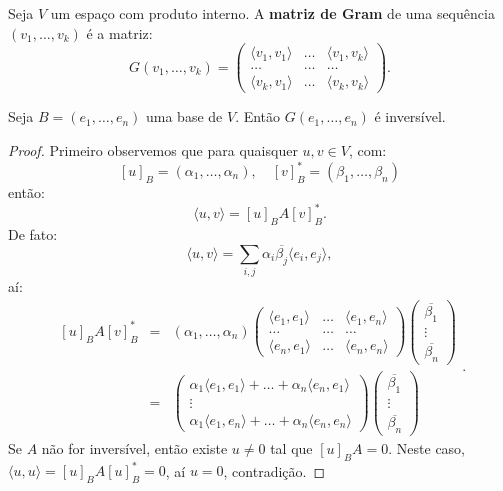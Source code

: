 \documentclass[11pt,twoside,a4paper]{book}
\begin{document}
\begin{definicao}
Seja $V$ um espaço com produto interno. A \textbf{matriz de Gram} de uma sequência $(v_1,\dots,v_k)$ é a matriz:
\[
G(v_1,\dots,v_k)=\begin{pmatrix}
\langle v_1,v_1\rangle&\dots&\langle v_1,v_k\rangle\\\dots&\dots&\dots\\\langle v_k,v_1\rangle&\dots&\langle v_k,v_k\rangle
\end{pmatrix}.
\]
\end{definicao}

\begin{proposicao}
Seja $B=(e_1,\dots,e_n)$ uma base de $V$. Então $G(e_1,\dots,e_n)$ é inversível.
\end{proposicao}
\begin{proof}
Primeiro observemos que para quaisquer $u,v\in V$, com:
\[
[u]_B=(\alpha_1,\dots,\alpha_n),\quad [v]_B^*=(\beta_1,\dots,\beta_n)
\]
então:
\[
\langle u,v\rangle=[u]_BA[v]_B^*.
\]
De fato:
\[
\langle u,v\rangle=\sum_{i,j}\alpha_i\overline{\beta_j}\langle e_i,e_j\rangle,
\]
aí:
\[
\begin{array}{rcl}
[u]_BA[v]_B^*&=&(\alpha_1,\dots,\alpha_n)\begin{pmatrix}
\langle e_1,e_1\rangle&\dots&\langle e_1,e_n\rangle\\\dots&\dots&\dots\\\langle e_n,e_1\rangle&\dots&\langle e_n,e_n\rangle
\end{pmatrix}\begin{pmatrix}
\overline{\beta_1}\\\vdots\\\overline{\beta_n}
\end{pmatrix}\\
&=&\begin{pmatrix}
\alpha_1\langle e_1,e_1\rangle+\dots+\alpha_n\langle e_n,e_1\rangle\\\vdots\\\alpha_1\langle e_1,e_n\rangle+\dots+\alpha_n\langle e_n,e_n\rangle
\end{pmatrix}\begin{pmatrix}
\overline{\beta_1}\\\vdots\\\overline{\beta_n}
\end{pmatrix}
\end{array}.
\]
Se $A$ não for inversível, então existe $u\neq 0$ tal que $[u]_BA=0$. Neste caso, $\langle u,u\rangle=[u]_BA[u]_B^*=0$, aí $u=0$, contradição.
\end{proof}
\end{document}
